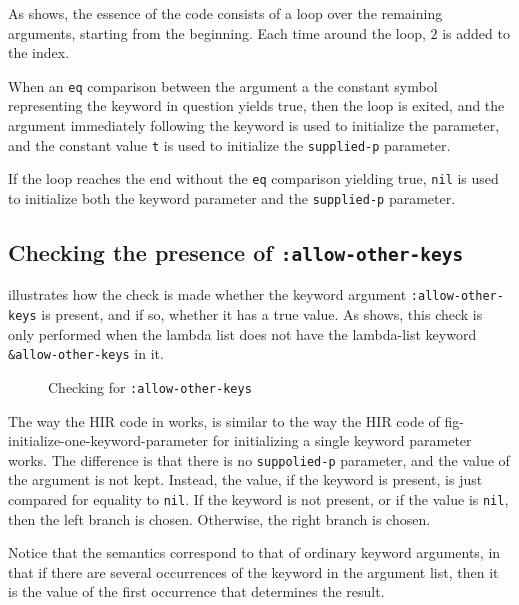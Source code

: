 As  shows, the essence of
the code consists of a loop over the remaining arguments, starting
from the beginning.  Each time around the loop, $2$ is added to the
index.

When an \texttt{eq} comparison between the argument a the constant
symbol representing the keyword in question yields true, then the loop
is exited, and the argument immediately following the keyword is used
to initialize the parameter, and the constant value \texttt{t} is used
to initialize the \texttt{supplied-p} parameter.

If the loop reaches the end without the \texttt{eq} comparison
yielding true, \texttt{nil} is used to initialize both the keyword
parameter and the \texttt{supplied-p} parameter.

\subsection{Checking the presence of \texttt{:allow-other-keys}}

 illustrates how the check is made
whether the keyword argument \texttt{:allow-other-keys} is present,
and if so, whether it has a true value.  As
 shows, this check is only
performed when the lambda list does not have the lambda-list keyword
\texttt{\&allow-other-keys} in it.

\begin{figure}
\begin{center}
\end{center}
\caption{\label{fig-check-allow-other-keys}
Checking for \texttt{:allow-other-keys}}
\end{figure}

The way the HIR code in  works, is
similar to the way the HIR code of
{fig-initialize-one-keyword-parameter} for initializing a single
keyword parameter works.  The difference is that there is no
\texttt{suppolied-p} parameter, and the value of the argument is not
kept.  Instead, the value, if the keyword is present, is just compared
for equality to \texttt{nil}.  If the keyword is not present, or if
the value is \texttt{nil}, then the left branch is chosen.  Otherwise,
the right branch is chosen.

Notice that the semantics correspond to that of ordinary keyword
arguments, in that if there are several occurrences of the keyword in
the argument list, then it is the value of the first occurrence that
determines the result.

